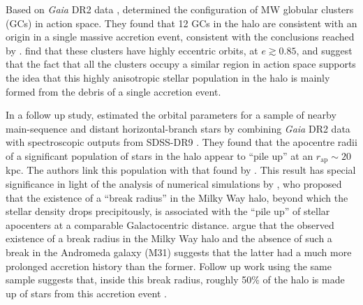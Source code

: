Based on \emph{Gaia} DR2 data \citep{2018arXiv180409365G},
\citet{2018arXiv180500453M} determined the configuration of MW
globular clusters (GCs) in action space.  They found that 12 GCs in
the halo are consistent with an origin in a single massive accretion
event, consistent with the conclusions reached by
\citet{2018MNRAS.478..611B}.  \citet{2018arXiv180500453M} find that
these clusters have highly eccentric orbits, at $e \gtrsim 0.85$,
and suggest that the fact that all the clusters occupy a similar
region in action space supports the idea that this highly anisotropic
stellar population in the halo is mainly formed from the debris of
a single accretion event.

In a follow up study, \citet{2018arXiv180510288D} estimated the
orbital parameters for a sample of nearby main-sequence and distant
horizontal-branch stars by combining \emph{Gaia} DR2 data
with spectroscopic outputs from SDSS-DR9 \citep{2012ApJS..203...21A}.
They found that the apocentre radii of a significant population of
stars in the halo appear to ``pile up'' at an $r_\mathrm{ap} \sim 20$
kpc. The authors link this population with that found by
\citet{2018MNRAS.478..611B}.   
This result has special significance in light of the analysis of
numerical simulations by \citet{2013ApJ...763..113D}, who proposed
that the existence of a ``break radius'' in the Milky Way halo,
beyond which the stellar density drops precipitously, is associated
with the ``pile up'' of stellar apocenters at a comparable
Galactocentric distance.  \citet{2013ApJ...763..113D} argue that
the observed existence of a break radius in the Milky Way halo and
the absence of such a break in the Andromeda galaxy (M31) suggests
that the latter had a much more prolonged accretion history than
the former.  Follow up work using the same sample suggests
that, inside this break radius, roughly 50\% of the halo is made
up of stars from this accretion event \citep{2018arXiv180704290L}.

